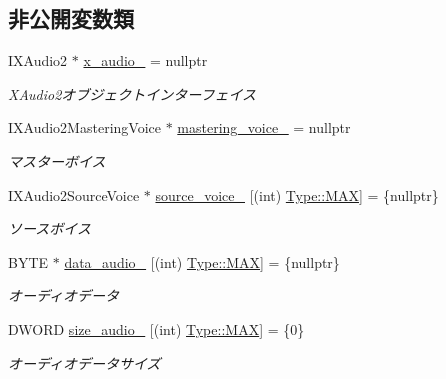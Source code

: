 \subsection*{非公開変数類}
\begin{DoxyCompactItemize}
\item 
I\+X\+Audio2 $\ast$ \mbox{\hyperlink{class_sound_manager_a61e40cffb2fea01e0840134e10bd8e69}{x\+\_\+audio\+\_\+}} = nullptr
\begin{DoxyCompactList}\small\item\em X\+Audio2オブジェクトインターフェイス \end{DoxyCompactList}\item 
I\+X\+Audio2\+Mastering\+Voice $\ast$ \mbox{\hyperlink{class_sound_manager_a96f7bde6fb880cb242434707cd769e64}{mastering\+\_\+voice\+\_\+}} = nullptr
\begin{DoxyCompactList}\small\item\em マスターボイス \end{DoxyCompactList}\item 
I\+X\+Audio2\+Source\+Voice $\ast$ \mbox{\hyperlink{class_sound_manager_a48fc88576a4066e7739138a3c4a0cd47}{source\+\_\+voice\+\_\+}} \mbox{[}(int) \mbox{\hyperlink{class_sound_manager_a0b81fc2281f062cd6489ab281fc3be1da26a4b44a837bf97b972628509912b4a5}{Type\+::\+M\+AX}}\mbox{]} = \{nullptr\}
\begin{DoxyCompactList}\small\item\em ソースボイス \end{DoxyCompactList}\item 
B\+Y\+TE $\ast$ \mbox{\hyperlink{class_sound_manager_ab519873998a45c15e8cf74881d3ee6ca}{data\+\_\+audio\+\_\+}} \mbox{[}(int) \mbox{\hyperlink{class_sound_manager_a0b81fc2281f062cd6489ab281fc3be1da26a4b44a837bf97b972628509912b4a5}{Type\+::\+M\+AX}}\mbox{]} = \{nullptr\}
\begin{DoxyCompactList}\small\item\em オーディオデータ \end{DoxyCompactList}\item 
D\+W\+O\+RD \mbox{\hyperlink{class_sound_manager_aa95190cc70cca6b516bed20f22f2f0ba}{size\+\_\+audio\+\_\+}} \mbox{[}(int) \mbox{\hyperlink{class_sound_manager_a0b81fc2281f062cd6489ab281fc3be1da26a4b44a837bf97b972628509912b4a5}{Type\+::\+M\+AX}}\mbox{]} = \{0\}
\begin{DoxyCompactList}\small\item\em オーディオデータサイズ \end{DoxyCompactList}\end{DoxyCompactItemize}
